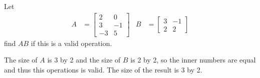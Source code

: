 \begin{example}
	Let
\begin{align*}
	A & =
\begin{bmatrix}
	2 & 0 \\ 3 & -1 \\ -3 & 5
\end{bmatrix}
& B& =
\begin{bmatrix}
	3 & -1 \\ 2 & 2
\end{bmatrix}
\end{align*}
find $AB$ if this is a valid operation.

\solution

The size of $A$ is 3 by 2 and the size of $B$ is 2 by 2, so the inner numbers are equal and thus this operations is valid.  The size of the result is 3 by 2.


\end{example}
